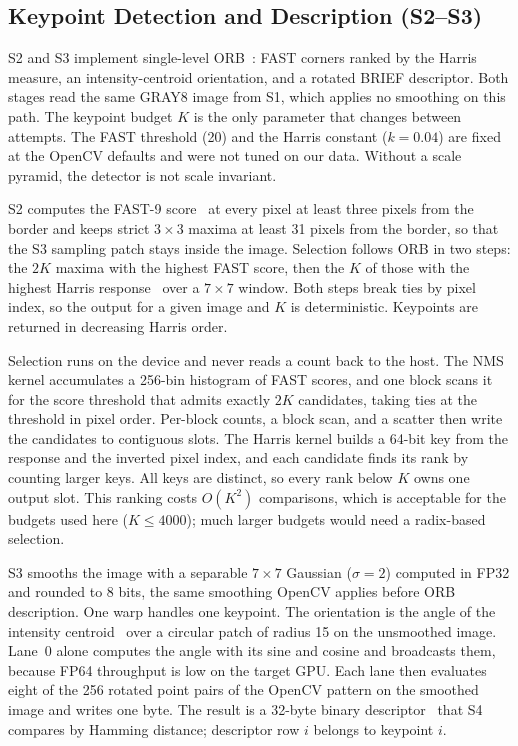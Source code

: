 \subsection{Keypoint Detection and Description (S2--S3)}
\label{sec:s2-s3}
S2 and S3 implement single-level ORB~\cite{rublee2011orb}: FAST corners ranked
by the Harris measure, an intensity-centroid orientation, and a rotated BRIEF
descriptor. Both stages read the same GRAY8 image from S1, which applies no
smoothing on this path. The keypoint budget $K$ is the only parameter that
changes between attempts. The FAST threshold (20) and the Harris constant
($k=0.04$) are fixed at the OpenCV defaults and were not tuned on our data.
Without a scale pyramid, the detector is not scale invariant.

S2 computes the FAST-9 score~\cite{rosten2006fast} at every pixel at least three
pixels from the border and keeps strict $3\times3$ maxima at least 31 pixels from
the border, so that the S3 sampling patch stays inside the image. Selection
follows ORB in two steps: the $2K$ maxima with the highest FAST score, then the
$K$ of those with the highest Harris response~\cite{harris1988corner} over a
$7\times7$ window. Both steps break ties by pixel index, so the output for a
given image and $K$ is deterministic. Keypoints are returned in decreasing
Harris order.

Selection runs on the device and never reads a count back to the host. The NMS
kernel accumulates a 256-bin histogram of FAST scores, and one block scans it
for the score threshold that admits exactly $2K$ candidates, taking ties at the
threshold in pixel order. Per-block counts, a block scan, and a scatter then
write the candidates to contiguous slots. The Harris kernel builds a 64-bit key
from the response and the inverted pixel index, and each candidate finds its
rank by counting larger keys. All keys are distinct, so every rank below $K$
owns one output slot. This ranking costs $O(K^2)$ comparisons, which is
acceptable for the budgets used here ($K\le 4000$); much larger budgets would
need a radix-based selection.

S3 smooths the image with a separable $7\times7$ Gaussian ($\sigma=2$) computed
in FP32 and rounded to 8 bits, the same smoothing OpenCV applies before ORB
description. One warp handles one keypoint. The orientation is the angle of the
intensity centroid~\cite{rosin1999corner} over a circular patch of radius 15 on
the unsmoothed image. Lane~0 alone computes the angle with its sine and cosine
and broadcasts them, because FP64 throughput is low on the target GPU. Each lane
then evaluates eight of the 256 rotated point pairs of the OpenCV pattern on the
smoothed image and writes one byte. The result is a 32-byte binary
descriptor~\cite{calonder2010brief} that S4 compares by Hamming distance;
descriptor row $i$ belongs to keypoint $i$.

